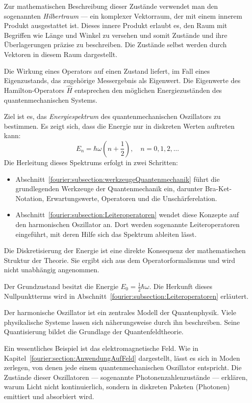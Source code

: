 	Zur mathematischen Beschreibung dieser Zustände verwendet man den sogenannten \emph{Hilbertraum} --- ein komplexer Vektorraum, der mit einem innerem Produkt ausgestattet ist.
	Dieses innere Produkt erlaubt es, den Raum mit Begriffen wie Länge und Winkel zu versehen und somit Zustände und ihre Überlagerungen präzise zu beschreiben.
	Die Zustände selbst werden durch Vektoren in diesem Raum dargestellt.

	Die Wirkung eines Operators auf einen Zustand liefert, im Fall eines Eigenzustands, das zugehörige Messergebnis als Eigenwert.
	Die Eigenwerte des Hamilton-Operators $\hat{H}$ entsprechen den möglichen Energiezuständen des quantenmechanischen Systems.

	Ziel ist es, das \emph{Energiespektrum} des quantenmechanischen Oszillators zu bestimmen.
	Es zeigt sich, dass die Energie nur in diskreten Werten auftreten kann:
	\[
	E_n = \hbar \omega \left(n + \frac{1}{2} \right), \quad n = 0, 1, 2, \dots
	\]
	Die Herleitung dieses Spektrums erfolgt in zwei Schritten:
	\begin{itemize}
		\item Abschnitt~\ref{fourier:subsection:werkzeugeQuantenmechanik} führt die grundlegenden Werkzeuge der Quantenmechanik ein, darunter Bra-Ket-Notation, Erwartungswerte, Operatoren und die Unschärferelation.
		\item Abschnitt~\ref{fourier:subsection:Leiteroperatoren} wendet diese Konzepte auf den harmonischen Oszillator an.
		Dort werden sogenannte Leiteroperatoren eingeführt, mit deren Hilfe sich das Spektrum ableiten lässt.
	\end{itemize}
	Die Diskretisierung der Energie ist eine direkte Konsequenz der mathematischen Struktur der Theorie.
	Sie ergibt sich aus dem Operatorformalismus und wird nicht unabhängig angenommen.


	Der Grundzustand besitzt die Energie $E_0 = \frac{1}{2}\hbar \omega$.
	Die Herkunft dieses Nullpunktterms wird in Abschnitt~\ref{fourier:subsection:Leiteroperatoren} erläutert.

	Der harmonische Oszillator ist ein zentrales Modell der Quantenphysik.
	Viele physikalische Systeme lassen sich näherungsweise durch ihn beschreiben.
	Seine Quantisierung bildet die Grundlage der Quantenfeldtheorie.

	Ein wesentliches Beispiel ist das elektromagnetische Feld. Wie in Kapitel~\ref{fourier:section:AnwendungAufFeld} dargestellt, lässt es sich in Moden zerlegen, von denen jede einem quantenmechanischen Oszillator entspricht.
	Die Zustände dieser Oszillatoren --- sogenannte Photonenzahlenzustände --- erklären, warum Licht nicht kontinuierlich, sondern in diskreten Paketen (Photonen) emittiert und absorbiert wird.
	
